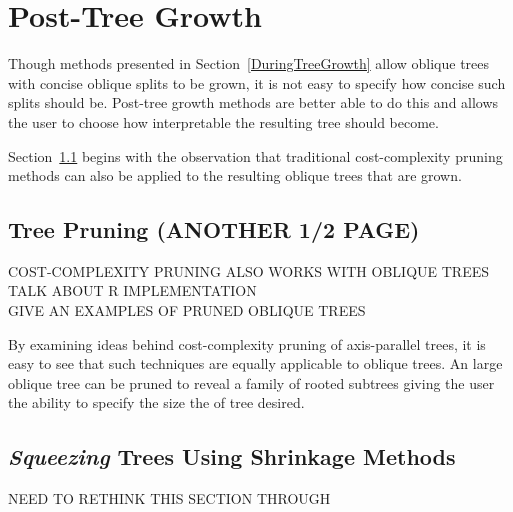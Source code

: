 \section{Post-Tree Growth}
\label{PostTreeGrowth}
Though methods presented in Section~\ref{DuringTreeGrowth} allow oblique trees with concise oblique splits to be grown, it is not easy to specify how concise such splits should be. Post-tree growth methods are better able to do this and allows the user to choose how interpretable the resulting tree should become. \\

Section~\ref{TreePruning} begins with the observation that traditional cost-complexity pruning methods can also be applied to the resulting oblique trees that are grown. %

\subsection{Tree Pruning (ANOTHER 1/2 PAGE)}
\label{TreePruning}
\noindent COST-COMPLEXITY PRUNING ALSO WORKS WITH OBLIQUE TREES\\
\noindent TALK ABOUT R IMPLEMENTATION\\
\noindent GIVE AN EXAMPLES OF PRUNED OBLIQUE TREES 

By examining ideas behind cost-complexity pruning of axis-parallel trees, it is easy to see that such techniques are equally applicable to oblique trees. An large oblique tree can be pruned to reveal a family of rooted subtrees giving the user the ability to specify the size the of tree desired.\\


\subsection{\emph{Squeezing} Trees Using Shrinkage Methods}
\noindent NEED TO RETHINK THIS SECTION THROUGH \\

